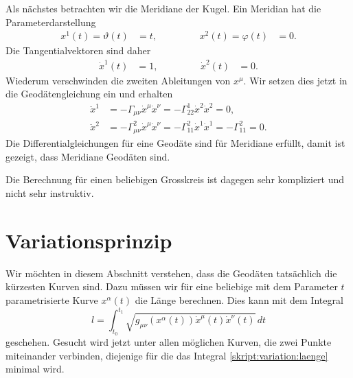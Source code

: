 Als nächstes betrachten wir die Meridiane der Kugel.
Ein Meridian hat die Parameterdarstellung
\[
\begin{aligned}
x^1(t)=\vartheta(t)&=t,
&\qquad&&
x^2(t)=\varphi(t)&=0.
\end{aligned}
\]
Die Tangentialvektoren sind daher
\[
\begin{aligned}
\dot x^1(t)&=1,
&\qquad&&
\dot x^2(t)&=0.
\end{aligned}
\]
Wiederum verschwinden
die zweiten Ableitungen von $x^\mu$.
Wir setzen dies jetzt in die Geodäten\-gleichung ein und erhalten
\begin{align*}
\ddot x^1
&=
-\Gamma_{\mu\nu}\dot x^\mu \dot x^\nu
=
-\Gamma_{22}^1\dot x^2 \dot x^2
=
0,
\\
\ddot x^2
&=
-\Gamma_{\mu\nu}^2\dot x^\mu \dot x^\nu
=
-\Gamma_{11}^2\dot x^1\dot x^1
=
-\Gamma_{11}^2
=
0.
\end{align*}
Die Differentialgleichungen für eine Geodäte sind für Meridiane erfüllt,
damit ist gezeigt, dass Meridiane Geodäten sind.

Die Berechnung für einen beliebigen Grosskreis ist dagegen sehr 
kompliziert und nicht sehr instruktiv.

\section{Variationsprinzip}
Wir möchten in diesem Abschnitt verstehen, dass die Geodäten tatsächlich 
die kürzesten Kurven sind.
Dazu müssen wir für eine beliebige mit dem Parameter $t$ parametrisierte
Kurve $x^\alpha(t)$ die Länge berechnen.
Dies kann mit dem Integral
\begin{equation}
l=\int_{t_0}^{t_1} \sqrt{g_{\mu\nu}(x^\alpha(t)) \dot x^\mu(t)\dot x^\nu(t)}\,dt
\label{skript:variation:laenge}
\end{equation}
geschehen.
Gesucht wird jetzt unter allen möglichen Kurven, die zwei Punkte miteinander
verbinden, diejenige für die das Integral \eqref{skript:variation:laenge}
minimal wird.

